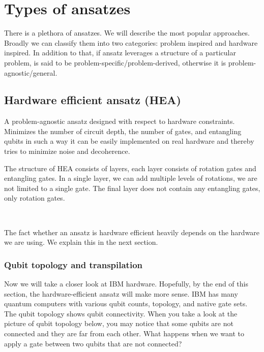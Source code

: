 \section{Types of ansatzes}
There is a plethora of ansatzes. We will describe the most popular approaches. Broadly we can classify them into two categories: problem inspired and hardware inspired. In addition to that, if ansatz leverages a structure of a particular problem, is said to be problem-specific/problem-derived, otherwise it is problem-agnostic/general. 

\subsection{Hardware efficient ansatz (HEA)}
A problem-agnostic ansatz designed with respect to hardware constraints. Minimizes the number of circuit depth, the number of gates, and entangling qubits in such a way it can be easily implemented on real hardware and thereby tries to minimize noise and decoherence.

The structure of HEA consists of layers, each layer consists of rotation gates and entangling gates. In a single layer, we can add multiple levels of rotations, we are not limited to a single gate. The final layer does not contain any entangling gates, only rotation gates.

\\

The fact whether an ansatz is hardware efficient heavily depends on the hardware we are using. We explain this in the next section.

\subsubsection{Qubit topology and transpilation}
Now we will take a closer look at IBM hardware. Hopefully, by the end of this section, the hardware-efficient ansatz will make more sense. IBM has many quantum computers with various qubit counts, topology, and native gate sets. The qubit topology shows qubit connectivity. When you take a look at the picture of qubit topology below, you may notice that some qubits are not connected and they are far from each other. What happens when we want to apply a gate between two qubits that are not connected? 


